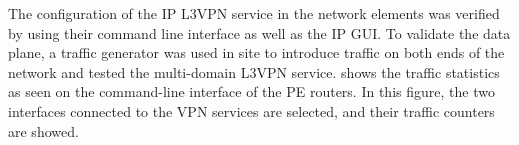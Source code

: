 \documentclass[10pt, conference]{IEEEtran}
\begin{document}


The configuration of the IP L3VPN service in the network elements was verified by using their command line interface as well as the IP GUI. To validate the data plane, a traffic generator was used in site to introduce traffic on both ends of the network and tested the multi-domain L3VPN service.  shows the traffic statistics as seen on the command-line interface of the PE routers. In this figure, the two interfaces connected to the VPN services are selected, and their traffic counters are showed.  


\end{document}
